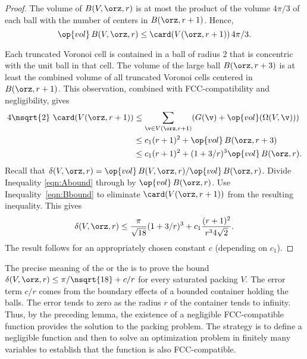 \begin{proof} 
The volume of $B( V,\orz,r)$ is at most the product of the volume
$4\pi/3$ of each ball with the number of centers in
$B(\orz,r+1)$.  Hence,
\begin{equation} 
\op{vol}\, B( V,\orz,r) \le \card( V(\orz,r+1))\, 4\pi/3.
\label{eqn:Abound}
\end{equation}

Each truncated Voronoi cell is contained in a ball of radius $2$ that
is concentric with the unit ball in that cell.  The volume of the
large ball $B(\orz,r+3)$ is at least the combined volume of all
truncated Voronoi cells centered in $B(\orz,r+1)$. This observation,
combined with FCC-compatibility and negligibility, gives
\begin{equation} 
\begin{split} 
4\nsqrt{2}\,\,\card( V(\orz,r+1))
&\le \sum_{\v\in V(\orz,r+1)} (G(\v) +
\op{vol}(\Omega(V,\v))) \\
&\le c_1 (r+1)^2 + \op{vol}\,B(\orz,r+3) \\
&\le c_1 (r+1)^2 + (1+3/r)^3 \op{vol}\,B(\orz,r).
\label{eqn:Bbound}
\end{split}
\end{equation}
%
Recall that $\delta( V,\orz,r)=
\op{vol}\,B( V,\orz,r)/\op{vol}\,B(\orz,r)$. Divide Inequality
\ref{eqn:Abound} through by $\op{vol}\,B(\orz,r)$.  Use
Inequality~\ref{eqn:Bbound} to eliminate $\card( V(\orz,r+1))$ from the
resulting inequality.  This gives
\[ \delta( V,\orz,r)
\le \frac{\pi}{\sqrt{18}} (1+3/r)^3 + c_1 \frac{(r+1)^2}{r^34\sqrt{2}}.
\] 
The result follows for an appropriately chosen constant $c$
(depending on $c_1$).
\end{proof}

\begin{remark}
\label{remark:precise} 
The precise meaning of the  or the
 is to prove the bound $\delta(
V,\orz,r) \le \pi/\nsqrt{18} + c/r$ for every saturated packing $ V$.
The error term $c/r$ comes from the boundary effects of a bounded
container holding the balls.  The error tends to zero as the radius
$r$ of the container tends to infinity.  Thus, by the preceding lemma,
the existence of a negligible FCC-compatible function provides the
solution to the packing problem.  The strategy is to define a
negligible function and then to solve an optimization problem in
finitely many variables to establish that the function is also
FCC-compatible.
\end{remark}





